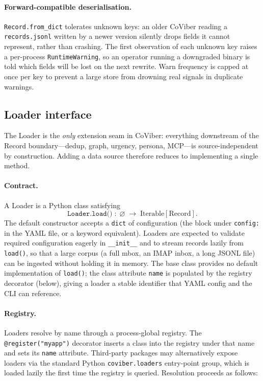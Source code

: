 \paragraph{Forward-compatible deserialisation.}
\texttt{Record.from\_dict} tolerates unknown keys: an older CoViber reading a
\texttt{records.jsonl} written by a newer version silently drops fields it
cannot represent, rather than crashing. The first observation of each unknown
key raises a per-process \texttt{RuntimeWarning}, so an operator running a
downgraded binary is told which fields will be lost on the next rewrite. Warn
frequency is capped at once per key to prevent a large store from drowning
real signals in duplicate warnings.

\subsection{Loader interface}
\label{sec:loader}

The Loader is the \emph{only} extension seam in CoViber: everything downstream
of the Record boundary---dedup, graph, urgency, persona, MCP---is
source-independent by construction. Adding a data source therefore reduces to
implementing a single method.

\paragraph{Contract.}
A Loader is a Python class satisfying
\begin{equation*}
\texttt{Loader.load()} \;:\; \varnothing \;\longrightarrow\; \mathrm{Iterable}[\mathrm{Record}].
\end{equation*}
The default constructor accepts a \texttt{dict} of configuration (the block
under \texttt{config:} in the YAML file, or a keyword equivalent). Loaders are
expected to validate required configuration eagerly in \texttt{\_\_init\_\_}
and to stream records lazily from \texttt{load()}, so that a large corpus
(a full mbox, an IMAP inbox, a long JSONL file) can be ingested without
holding it in memory. The base class provides no default implementation of
\texttt{load()}; the class attribute \texttt{name} is populated by the
registry decorator (below), giving a loader a stable identifier that YAML
config and the CLI can reference.

\paragraph{Registry.}
Loaders resolve by name through a process-global registry. The
\texttt{@register("myapp")} decorator inserts a class into the registry under
that name and sets its \texttt{name} attribute. Third-party packages may
alternatively expose loaders via the standard Python \texttt{coviber.loaders}
entry-point group, which is loaded lazily the first time the registry is
queried. Resolution proceeds as follows:

